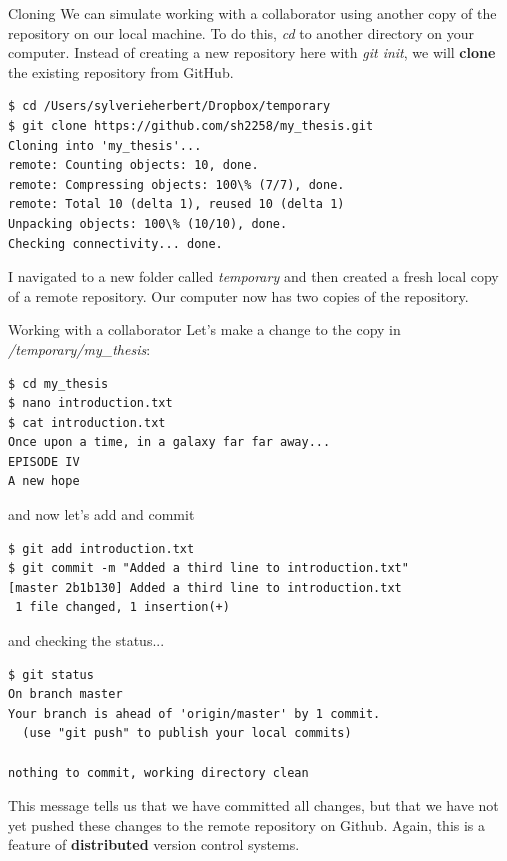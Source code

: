 \documentclass[10pt]{beamer}
\begin{document}
\begin{frame}[fragile]{Cloning}
We can simulate working with a collaborator using another copy of the repository on our local machine. To do this, \emph{cd} to another directory on your computer. Instead of creating a new repository here with \emph{git init}, we will \textbf{clone} the existing repository from GitHub.
\begin{lstlisting}
$ cd /Users/sylverieherbert/Dropbox/temporary
$ git clone https://github.com/sh2258/my_thesis.git
Cloning into 'my_thesis'...
remote: Counting objects: 10, done.
remote: Compressing objects: 100\% (7/7), done.
remote: Total 10 (delta 1), reused 10 (delta 1)
Unpacking objects: 100\% (10/10), done.
Checking connectivity... done.
\end{lstlisting}
I navigated to a new folder called \emph{temporary} and then created a fresh local copy of a remote repository. Our computer now has two copies of the repository.

\end{frame}

\begin{frame}[fragile]{Working with a collaborator}
Let's make a change to the copy in \emph{/temporary/my\_thesis}:
\begin{lstlisting}
$ cd my_thesis
$ nano introduction.txt
$ cat introduction.txt
Once upon a time, in a galaxy far far away...
EPISODE IV
A new hope
\end{lstlisting}
and now let's add and commit
\begin{lstlisting}
$ git add introduction.txt
$ git commit -m "Added a third line to introduction.txt"
[master 2b1b130] Added a third line to introduction.txt
 1 file changed, 1 insertion(+)
\end{lstlisting}
and checking the status...
\begin{lstlisting}
$ git status
On branch master
Your branch is ahead of 'origin/master' by 1 commit.
  (use "git push" to publish your local commits)

nothing to commit, working directory clean
\end{lstlisting}
This message tells us that we have committed all changes, but that we have not yet pushed these changes to the remote repository on Github. Again, this is a feature of \textbf{distributed} version control systems.\\


\end{frame}
\end{document}
